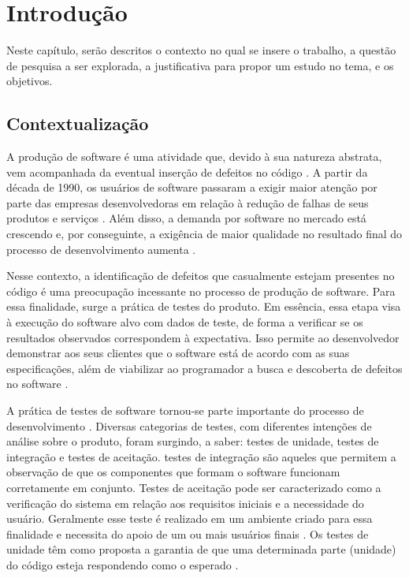 \chapter[Introdução]{Introdução}

Neste capítulo, serão descritos o contexto no qual se insere o trabalho, a
questão de pesquisa a ser explorada, a justificativa para propor um estudo no
tema, e os objetivos.

\section{Contextualização}
\indent A produção de software é uma atividade que, devido à sua natureza
abstrata, vem acompanhada da eventual inserção de defeitos no código
\cite{trodo2009}. A partir da década de 1990, os usuários de software
passaram a exigir maior atenção por parte das empresas desenvolvedoras em 
relação à redução de falhas de seus produtos e serviços
\cite{sommerville2007}. Além disso, a demanda por software no mercado está
crescendo \cite{philipson2004} e, por conseguinte, a exigência de maior
qualidade no resultado final do processo de desenvolvimento aumenta
\cite{barbosaEtAl2009}.
\par
\indent Nesse contexto, a identificação de defeitos que casualmente estejam
presentes no código é uma preocupação incessante no processo de produção de
software. Para essa finalidade, surge a prática de testes do produto. Em
essência, essa etapa visa à execução do software alvo com dados de teste, de
forma a verificar se os resultados observados correspondem à expectativa.
Isso permite ao desenvolvedor demonstrar aos seus clientes que o software
está de acordo com as suas especificações, além de viabilizar ao
programador a busca e descoberta de defeitos no software
\cite{sommerville2007}.
\par
\indent A prática de testes de software tornou-se parte importante do
processo de desenvolvimento \cite{barbosaEtAl2009}. Diversas categorias de
testes, com diferentes intenções de análise sobre o produto, foram surgindo,
a saber: testes de unidade, testes de integração e testes de aceitação.
testes de integração são aqueles que permitem a observação de que os
componentes que formam o software funcionam corretamente em conjunto. Testes
de aceitação pode ser caracterizado como a verificação do sistema em relação aos requisitos iniciais e a necessidade do usuário. Geralmente esse teste é realizado em um ambiente criado para essa finalidade e necessita do apoio de um ou mais usuários finais \cite{myers2004}. Os testes de unidade têm como proposta a garantia  de que uma determinada parte (unidade) do código esteja respondendo como o esperado \cite{sommerville2007}.
